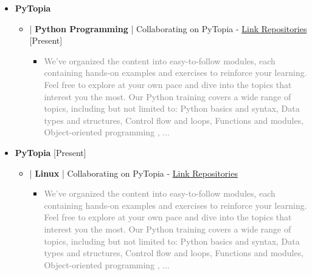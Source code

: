 \documentclass[10pt,a4paper,sans]{moderncv} %
\begin{document}
        \begin{itemize}
		\item {} \textbf{PyTopia }    
		\vspace{0.5em}

      \begin{itemize}
       \item{} | \textbf{Python Programming} | Collaborating on PyTopia - {\href{https://github.com/pytopia/Python-2023}{Link Repositories}} \hfill[Present]
        
		\begin{itemize}
			\item \textcolor{gray}{We've organized the content into easy-to-follow modules, each containing hands-on examples and exercises to reinforce your learning. Feel free to explore at your own pace and dive into the topics that interest you the most. Our Python training covers a wide range of topics, including but not limited to: Python basics and syntax, Data types and structures, Control flow and loops, Functions and modules, Object-oriented programming , ...} 

			\end{itemize}	
				
 		\end{itemize}
     \end{itemize}
  \vspace{1.5em}
             \begin{itemize}
		\item {} \textbf{PyTopia }   \hfill[Present] 
		\vspace{0.5em}

      \begin{itemize}
       \item{} | \textbf{Linux} | Collaborating on PyTopia - \href{https://github.com/pytopia/Python-2023}{Link Repositories}
        
		\begin{itemize}
			\item \textcolor{gray}{We've organized the content into easy-to-follow modules, each containing hands-on examples and exercises to reinforce your learning. Feel free to explore at your own pace and dive into the topics that interest you the most. Our Python training covers a wide range of topics, including but not limited to: Python basics and syntax, Data types and structures, Control flow and loops, Functions and modules, Object-oriented programming , ...}




			\end{itemize}	
				
		\end{itemize}
  
		\end{itemize}
\end{document}
